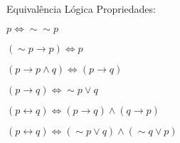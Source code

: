 \begin{frame}[t]{Equivalência Lógica} %
	Propriedades:
	\begin{description}
	\item [Dupla Negação:] $p \Leftrightarrow \sim\sim p$

	\item [Regra de CLAVIUS:] $(\sim p \rightarrow p) \Leftrightarrow p$

	\item [Regra da Absorção:] $(p \rightarrow p \wedge q) \Leftrightarrow (p \rightarrow q)$

	\item $(p \rightarrow q) \Leftrightarrow \sim p \vee q$

	\item $(p \leftrightarrow q) \Leftrightarrow (p \rightarrow q) \wedge (q \rightarrow p)$

	\item $(p \leftrightarrow q) \Leftrightarrow (\sim p \vee q) \wedge (\sim q \vee p)$
	\end{description}
\end{frame}

